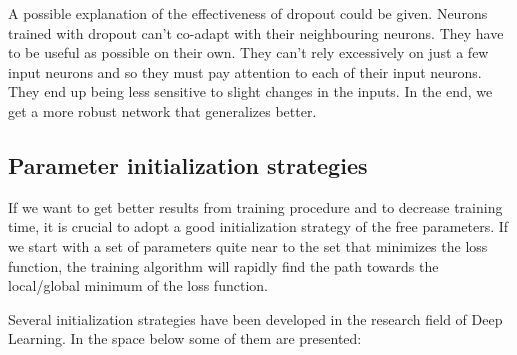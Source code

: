 A possible explanation of the effectiveness of dropout could be given. Neurons trained with dropout can't co-adapt with their neighbouring neurons. They have to be useful as possible on their own. They can't rely excessively on just a few input neurons and so they must pay attention to each of their input neurons. They end up being less sensitive to slight changes in the inputs. In the end, we get a more robust network that generalizes better.



\subsection{Parameter initialization strategies}
If we want to get better results from training procedure and to decrease training time, it is crucial to adopt a good initialization strategy of the free parameters. If we start with a set of parameters quite near to the set that minimizes the loss function, the training algorithm will rapidly find the path towards the local/global minimum of the loss function.

Several initialization strategies have been developed in the research field of Deep Learning. In the space below some of them are presented:

